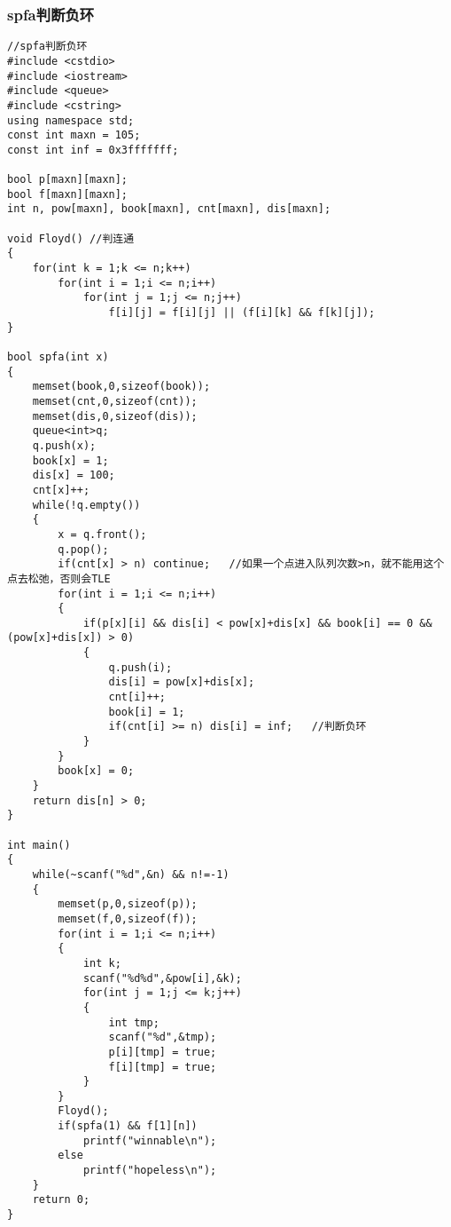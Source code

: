 \documentclass[twoside]{article}
\begin{document}
\subsubsection{spfa判断负环}
\begin{lstlisting}
//spfa判断负环 
#include <cstdio>
#include <iostream>
#include <queue>
#include <cstring>
using namespace std;
const int maxn = 105;
const int inf = 0x3fffffff;

bool p[maxn][maxn];
bool f[maxn][maxn];
int n, pow[maxn], book[maxn], cnt[maxn], dis[maxn];

void Floyd() //判连通
{
	for(int k = 1;k <= n;k++)
		for(int i = 1;i <= n;i++)
			for(int j = 1;j <= n;j++)
				f[i][j] = f[i][j] || (f[i][k] && f[k][j]);
}

bool spfa(int x)
{
	memset(book,0,sizeof(book));
	memset(cnt,0,sizeof(cnt));
	memset(dis,0,sizeof(dis));
	queue<int>q;
	q.push(x);
	book[x] = 1;
	dis[x] = 100;
	cnt[x]++;
	while(!q.empty())
	{
		x = q.front();
		q.pop();
		if(cnt[x] > n) continue;   //如果一个点进入队列次数>n，就不能用这个点去松弛，否则会TLE 
		for(int i = 1;i <= n;i++)
		{
			if(p[x][i] && dis[i] < pow[x]+dis[x] && book[i] == 0 && (pow[x]+dis[x]) > 0)
			{
				q.push(i);
				dis[i] = pow[x]+dis[x];
				cnt[i]++;
				book[i] = 1;
				if(cnt[i] >= n) dis[i] = inf;	//判断负环 
			}	
		}
		book[x] = 0;	
	}	
	return dis[n] > 0;
}

int main()
{
	while(~scanf("%d",&n) && n!=-1)
	{
		memset(p,0,sizeof(p));
		memset(f,0,sizeof(f));
		for(int i = 1;i <= n;i++)
		{
			int k;
			scanf("%d%d",&pow[i],&k);
			for(int j = 1;j <= k;j++)
			{
				int tmp;
				scanf("%d",&tmp);
				p[i][tmp] = true;
				f[i][tmp] = true;
			}
		}
		Floyd();
		if(spfa(1) && f[1][n])
			printf("winnable\n");
		else
			printf("hopeless\n");
	}
	return 0;
}
\end{lstlisting}
\end{document}
